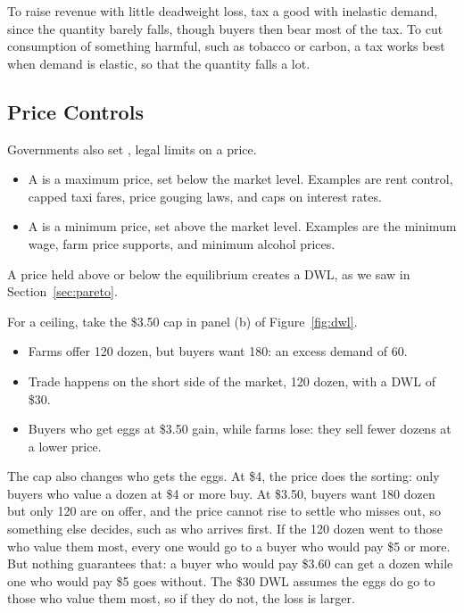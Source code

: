 \documentclass[11pt]{article}
\begin{document}
 To raise revenue with little deadweight loss, tax a good with inelastic demand, since the quantity barely falls, though buyers then bear most of the tax. To cut consumption of something harmful, such as tobacco or carbon, a tax works best when demand is elastic, so that the quantity falls a lot.

\subsection{Price Controls}

Governments also set , legal limits on a price.
\begin{itemize}
\item A  is a maximum price, set below the market level. Examples are rent control, capped taxi fares, price gouging laws, and caps on interest rates.
\item A  is a minimum price, set above the market level. Examples are the minimum wage, farm price supports, and minimum alcohol prices.
\end{itemize}
A price held above or below the equilibrium creates a DWL, as we saw in Section~\ref{sec:pareto}.

For a ceiling, take the \$3.50 cap in panel (b) of Figure~\ref{fig:dwl}.
\begin{itemize}
\item Farms offer 120 dozen, but buyers want 180: an excess demand of 60.
\item Trade happens on the short side of the market, 120 dozen, with a DWL of \$30.
\item Buyers who get eggs at \$3.50 gain, while farms lose: they sell fewer dozens at a lower price.
\end{itemize}

The cap also changes who gets the eggs. At \$4, the price does the sorting: only buyers who value a dozen at \$4 or more buy. At \$3.50, buyers want 180 dozen but only 120 are on offer, and the price cannot rise to settle who misses out, so something else decides, such as who arrives first. If the 120 dozen went to those who value them most, every one would go to a buyer who would pay \$5 or more. But nothing guarantees that: a buyer who would pay \$3.60 can get a dozen while one who would pay \$5 goes without. The \$30 DWL assumes the eggs do go to those who value them most, so if they do not, the loss is larger.
\end{document}
